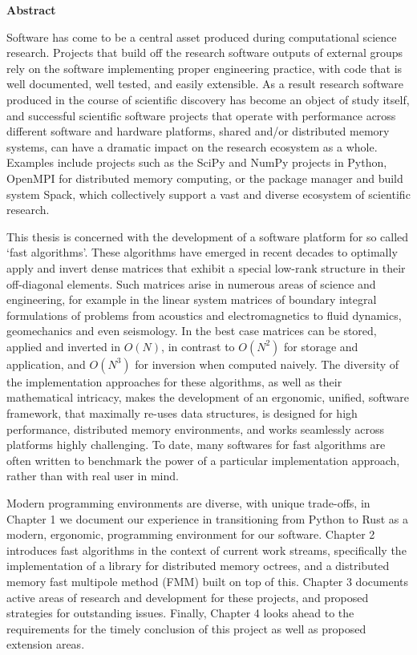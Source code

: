 \thispagestyle{plain}

\begin{center}
    \textbf{Abstract}
\end{center}

Software has come to be a central asset produced during
computational science research. Projects that build off the research software outputs of external
groups rely on the software implementing proper engineering practice,
with code that is well documented, well tested, and easily extensible. As a
result research software produced in the course of scientific discovery has
become an object of study itself, and successful scientific software projects
that operate with performance across different software and hardware platforms,
shared and/or distributed memory systems, can have a dramatic impact on the
research ecosystem as a whole. Examples include projects such as the SciPy and
NumPy projects in Python, OpenMPI for distributed memory computing, or the package
manager and build system Spack, which collectively support a vast and diverse ecosystem of scientific
research.

This thesis is concerned with the development of a software platform
for so called `fast algorithms'. These algorithms have emerged in recent decades to
optimally apply and invert dense matrices that exhibit
a special low-rank structure in their off-diagonal elements. Such matrices arise
in numerous areas of science and engineering, for example in the linear system
matrices of boundary integral formulations of problems from acoustics and
electromagnetics to fluid dynamics, geomechanics and even seismology. In the
best case matrices can be stored, applied and inverted in $O(N)$, in contrast
to $O(N^2)$ for storage and application, and $O(N^3)$ for inversion when computed
naively. The diversity of the implementation approaches for these algorithms, as
well as their mathematical intricacy, makes the development of an ergonomic,
unified, software framework, that maximally re-uses data structures, is designed
for high performance, distributed memory environments, and works seamlessly
across platforms highly challenging. To date, many softwares for fast algorithms
are often written to benchmark the power of a particular implementation approach,
rather than with real user in mind.

 Modern programming environments are diverse, with unique trade-offs, in Chapter 1 we document our experience in transitioning from Python to Rust as a
modern, ergonomic, programming environment for our software. Chapter 2 introduces
fast algorithms in the context of current work streams, specifically the
implementation of a library for distributed memory octrees, and a distributed memory fast
multipole method (FMM) built on top of this. Chapter 3 documents active areas
of research and development for these projects, and proposed strategies for
outstanding issues. Finally, Chapter 4 looks ahead to the requirements for the
timely conclusion of this project as well as proposed extension areas.
